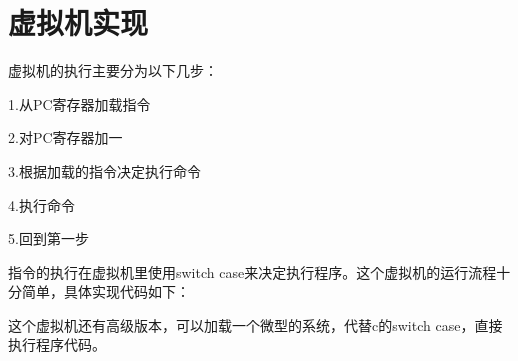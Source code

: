 \section{虚拟机实现}

虚拟机的执行主要分为以下几步：

1.从PC寄存器加载指令

2.对PC寄存器加一

3.根据加载的指令决定执行命令

4.执行命令

5.回到第一步

指令的执行在虚拟机里使用switch case来决定执行程序。这个虚拟机的运行流程十分简单，具体实现代码如下：

% 

% 

% 



这个虚拟机还有高级版本，可以加载一个微型的系统，代替c的switch case，直接执行程序代码。
